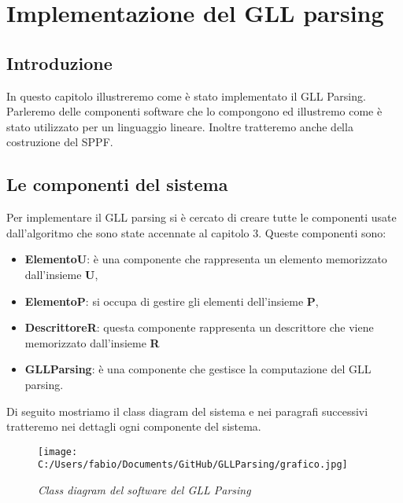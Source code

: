\chapter{Implementazione del GLL parsing}
\section{Introduzione}
In questo capitolo illustreremo come è stato implementato il GLL Parsing. Parleremo delle componenti software che lo compongono ed illustremo come è stato utilizzato per un linguaggio lineare. Inoltre tratteremo anche della costruzione del SPPF.
\section{Le componenti del sistema}
Per implementare il GLL parsing si è cercato di creare tutte le componenti usate dall'algoritmo che sono state accennate al capitolo 3. Queste componenti sono:
\begin{itemize}
	\item \textbf{ElementoU}: è una componente che rappresenta un elemento memorizzato dall'insieme \textbf{U},
	\item \textbf{ElementoP}: si occupa di gestire gli elementi dell'insieme \textbf{P},
	\item \textbf{DescrittoreR}: questa componente rappresenta un descrittore che viene memorizzato dall'insieme \textbf{R} 
	\item \textbf{GLLParsing}: è una componente che gestisce la computazione del GLL parsing.
\end{itemize}
Di seguito mostriamo il class diagram del sistema e nei paragrafi successivi tratteremo nei dettagli ogni componente del sistema.
\begin{figure}[h]
	\flushleft
	\texttt{[image: C:/Users/fabio/Documents/GitHub/GLLParsing/grafico.jpg]}
	\caption{\textit{Class diagram del software del GLL Parsing}}
\end{figure}

